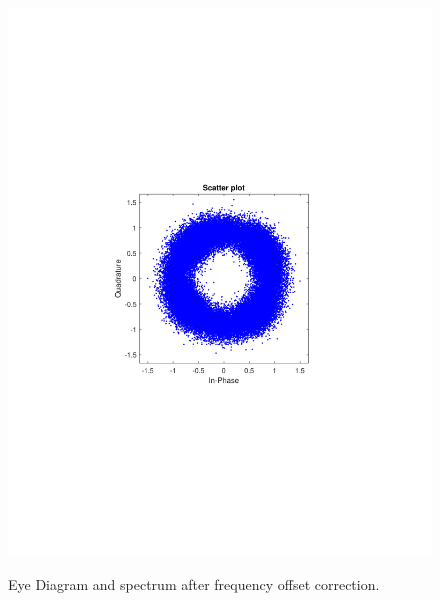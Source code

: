\begin{refsection}
\begin{figure}[H]
\begin{minipage}{0.30\textwidth}
		\includegraphics[clip, trim=4cm 8cm 4cm 8cm, width=1\textwidth]{./sdf/m_qam_system/figures/expResults/intradyne/4_const_4GBdInSig13dB_AfFE.pdf}
		\label{fig:4GBdSpecBefFec}
	\end{minipage}
	\caption{Eye Diagram and spectrum after frequency offset correction.}
\end{figure}


\end{refsection}
